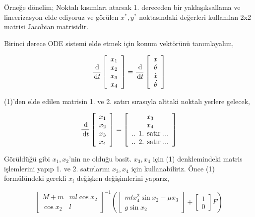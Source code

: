 \documentclass[12pt,fleqn]{article}\usepackage{../../common}
\begin{document}
Örneğe dönelim; Noktalı kısımları atarsak 1. dereceden bir yaklaşıksallama
ve lineerizasyon elde ediyoruz ve görülen $x^\ast,y^\ast$ noktasındaki değerleri
kullanılan 2x2 matrisi Jacobian matrisidir.

Birinci derece ODE sistemi elde etmek için konum vektörünü tanımlayalım,

$$
\frac{\,\mathrm{d}}{\,\mathrm{d} t} \left[\begin{array}{r}
x_1 \\ x_2 \\ x_3 \\ x_4
\end{array}\right] = 
\frac{\,\mathrm{d}}{\,\mathrm{d} t} 
\left[\begin{array}{r}
x \\ \theta \\ \dot{x} \\ \dot{\theta}
\end{array}\right]
$$

(1)'den elde edilen matrisin 1. ve 2. satırı sırasıyla alttaki noktalı
yerlere gelecek,

$$
\frac{\,\mathrm{d}}{\,\mathrm{d} t} \left[\begin{array}{rrr}
x_1 \\ x_2 \\ x_3 \\ x_4
\end{array}\right] = 
\left[\begin{array}{c}
x_3 \\ x_4 \\ \textrm{.. 1. satır ...} \\ \textrm{.. 2. satır ...}
\end{array}\right]
$$

Görüldüğü gibi $x_1,x_2$'nin ne olduğu basit. $x_3,x_4$ için (1)
denklemindeki matris işlemlerini yapıp 1. ve 2. satırlarını $x_3,x_4$ için
kullanabiliriz. Önce (1) formülündeki gerekli $x_i$ değişken değişimlerini
yaparız,

$$
\left[\begin{array}{rr}
M+m & m l \cos x_2 \\ \cos x_2 & l
\end{array}\right]^{-1}
\left(
  \left[\begin{array}{c}
  m l x_4^2 \sin x_2 - \mu x_3 \\
  g \sin x_2
  \end{array}\right] + 
  \left[\begin{array}{r}
  1 \\ 0
  \end{array}\right] F
\right)
$$
\end{document}
